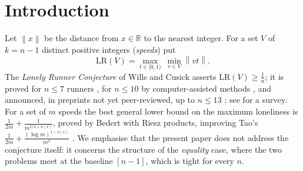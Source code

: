 \documentclass[11pt]{article}
\theoremstyle{definition}
\newcommand{\LR}{\mathrm{LR}}
\newcommand{\norm}[1]{\left\lVert #1 \right\rVert}
\begin{document}
\begin{abstract}
Finally, we position the classification against the current frontier.
The polynomial lower bound on the maximum loneliness due to Bedert
approaches the conjectural value from below and so leaves the equality
case untouched, and the recent spectrum counterexamples of Fan and Sun
delimit how far the Giri--Kravitz pattern can reach.  In the shifted
variant, where the runners start at adversarially chosen positions, the
baseline $[n-1]$ itself fails from five speeds on (Blanco--Criado--Santos);
we isolate a monotonicity lemma for the shifted gap
(Lemma~\ref{lem:shiftmono}) and formulate the shifted analogue of the
classification problem (Question~\ref{q:shifted}).
\end{abstract}

\section{Introduction}

Let $\norm{x}$ be the distance from $x\in\mathbb R$ to the nearest integer.
For a set $V$ of $k=n-1$ distinct positive integers (\emph{speeds}) put
\[
\LR(V)=\max_{t\in[0,1)}\ \min_{v\in V}\norm{vt}.
\]
The \emph{Lonely Runner Conjecture} of Wills \cite{Wills1967} and Cusick
\cite{Cusick1973} asserts $\LR(V)\ge\frac1n$; it is proved for $n\le7$
runners \cite{BetkeWills1972,CusickPomerance1984,BieniaEtAl1998,BohmanHolzmanKleitman2001,BarajasSerra2008},
for $n\le10$ by computer-assisted methods
\cite{Rosenfeld2025eight,Trakulthongchai2026}, and announced, in
preprints not yet peer-reviewed, up to $n\le13$
\cite{Rosenfeld2025nine,SungkawichaiTrakulthongchai2026};
see \cite{PerarnauSerra2025} for a survey.  For a set of $m$ speeds the
best general lower bound on the maximum loneliness is
$\tfrac1{2m}+\tfrac1{m^{5/3+o(1)}}$, proved by Bedert
\cite{Bedert2025} with Riesz products, improving Tao's
$\tfrac1{2m}+\tfrac{(\log m)^{1-o(1)}}{m^2}$ \cite{Tao2017}.  We emphasise that the present
paper does not address the conjecture itself: it concerns the structure of
the \emph{equality} case, where the two problems meet at the baseline
$[n-1]$, which is tight for every $n$.
\end{document}
